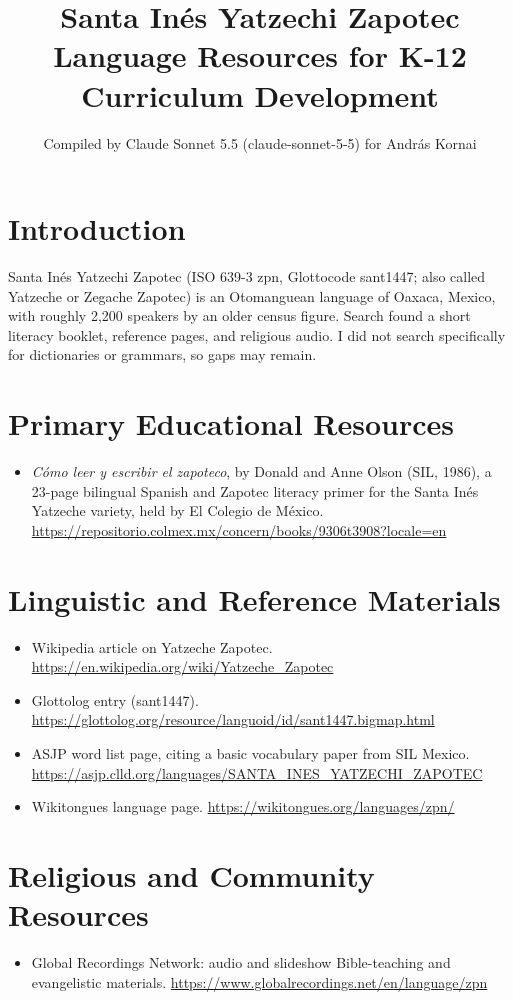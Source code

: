 \documentclass[12pt]{article}
\title{Santa In\'es Yatzechi Zapotec Language Resources for K-12 Curriculum Development}
\author{Compiled by Claude Sonnet 5.5 (claude-sonnet-5-5) for Andr\'as Kornai}
\date{}
\begin{document}
\maketitle

\section{Introduction}
Santa In\'es Yatzechi Zapotec (ISO 639-3 zpn, Glottocode sant1447; also called Yatzeche or Zegache Zapotec) is an Otomanguean language of Oaxaca, Mexico, with roughly 2,200 speakers by an older census figure. Search found a short literacy booklet, reference pages, and religious audio. I did not search specifically for dictionaries or grammars, so gaps may remain.

\section{Primary Educational Resources}
\begin{itemize}
\item \emph{C\'omo leer y escribir el zapoteco}, by Donald and Anne Olson (SIL, 1986), a 23-page bilingual Spanish and Zapotec literacy primer for the Santa In\'es Yatzeche variety, held by El Colegio de M\'exico. \url{https://repositorio.colmex.mx/concern/books/9306t3908?locale=en}
\end{itemize}

\section{Linguistic and Reference Materials}
\begin{itemize}
\item Wikipedia article on Yatzeche Zapotec. \url{https://en.wikipedia.org/wiki/Yatzeche_Zapotec}
\item Glottolog entry (sant1447). \url{https://glottolog.org/resource/languoid/id/sant1447.bigmap.html}
\item ASJP word list page, citing a basic vocabulary paper from SIL Mexico. \url{https://asjp.clld.org/languages/SANTA_INES_YATZECHI_ZAPOTEC}
\item Wikitongues language page. \url{https://wikitongues.org/languages/zpn/}
\end{itemize}

\section{Religious and Community Resources}
\begin{itemize}
\item Global Recordings Network: audio and slideshow Bible-teaching and evangelistic materials. \url{https://www.globalrecordings.net/en/language/zpn}
\end{itemize}
\end{document}
